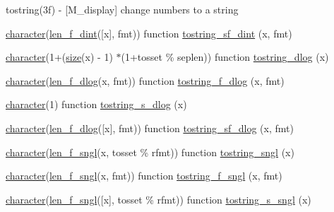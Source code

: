 \begin{DoxyCompactItemize}
\begin{DoxyCompactList}
tostring(3f) -\/ \mbox{[}M\+\_\+display\mbox{]} change numbers to a string \end{DoxyCompactList}\item 
\hyperlink{option__stopwatch_83_8txt_abd4b21fbbd175834027b5224bfe97e66}{character}(\hyperlink{namespacem__display_a6a2709cf5f243ee492f223b40c6b5143}{len\+\_\+f\+\_\+dint}(\mbox{[}x\mbox{]}, fmt)) function \hyperlink{interfacem__display_1_1tostring_a6fcaa07d4fdb0f6ee09a3e93bb380bd5}{tostring\+\_\+sf\+\_\+dint} (x, fmt)
\item 
\hyperlink{option__stopwatch_83_8txt_abd4b21fbbd175834027b5224bfe97e66}{character}(1+(\hyperlink{what__overview_81_8txt_ab5692ed87074f1d5ec850a9ffa8b5af9}{size}(x) -\/ 1) $\ast$(1+tosset \% seplen)) function \hyperlink{interfacem__display_1_1tostring_a0cebd4f420275674ff8cd7b0bed59523}{tostring\+\_\+dlog} (x)
\item 
\hyperlink{option__stopwatch_83_8txt_abd4b21fbbd175834027b5224bfe97e66}{character}(\hyperlink{namespacem__display_a2a298a8f2faf00047152b93cd265d396}{len\+\_\+f\+\_\+dlog}(x, fmt)) function \hyperlink{interfacem__display_1_1tostring_a58ee40052cd07a6004c4462fe0028016}{tostring\+\_\+f\+\_\+dlog} (x, fmt)
\item 
\hyperlink{option__stopwatch_83_8txt_abd4b21fbbd175834027b5224bfe97e66}{character}(1) function \hyperlink{interfacem__display_1_1tostring_a891f31a8821f0aa772158ef6b704f6ac}{tostring\+\_\+s\+\_\+dlog} (x)
\item 
\hyperlink{option__stopwatch_83_8txt_abd4b21fbbd175834027b5224bfe97e66}{character}(\hyperlink{namespacem__display_a2a298a8f2faf00047152b93cd265d396}{len\+\_\+f\+\_\+dlog}(\mbox{[}x\mbox{]}, fmt)) function \hyperlink{interfacem__display_1_1tostring_af94b7a40c83ff3f63fd8c3b3c034bc70}{tostring\+\_\+sf\+\_\+dlog} (x, fmt)
\item 
\hyperlink{option__stopwatch_83_8txt_abd4b21fbbd175834027b5224bfe97e66}{character}(\hyperlink{namespacem__display_ae0feb946fbc4c31f8ba53e20719fa508}{len\+\_\+f\+\_\+sngl}(x, tosset \% rfmt)) function \hyperlink{interfacem__display_1_1tostring_af054989252fce8a13f67a66b4155665a}{tostring\+\_\+sngl} (x)
\item 
\hyperlink{option__stopwatch_83_8txt_abd4b21fbbd175834027b5224bfe97e66}{character}(\hyperlink{namespacem__display_ae0feb946fbc4c31f8ba53e20719fa508}{len\+\_\+f\+\_\+sngl}(x, fmt)) function \hyperlink{interfacem__display_1_1tostring_a5782bd9b2ad742937bb3e907042c57e6}{tostring\+\_\+f\+\_\+sngl} (x, fmt)
\item 
\hyperlink{option__stopwatch_83_8txt_abd4b21fbbd175834027b5224bfe97e66}{character}(\hyperlink{namespacem__display_ae0feb946fbc4c31f8ba53e20719fa508}{len\+\_\+f\+\_\+sngl}(\mbox{[}x\mbox{]}, tosset \% rfmt)) function \hyperlink{interfacem__display_1_1tostring_a9ad4285955a5bfb8db555383b76a2fbc}{tostring\+\_\+s\+\_\+sngl} (x)

\end{DoxyCompactItemize}
